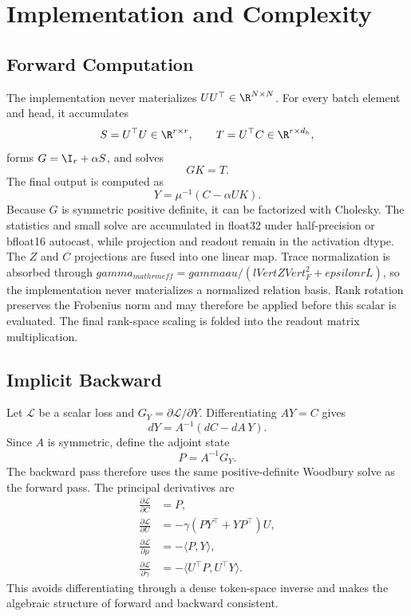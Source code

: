 \section{Implementation and Complexity}
\label{sec:implementation}

\subsection{Forward Computation}

The implementation never materializes $UU^\top\in\R^{N\times N}$. For every batch element and head, it accumulates
\begin{equation}
  S=U^\top U\in\R^{r\times r},
  \qquad
  T=U^\top C\in\R^{r\times d_h},
\end{equation}
forms $G=\I_r+\alpha S$, and solves
\begin{equation}
  GK=T.
\end{equation}
The final output is computed as
\begin{equation}
  Y=\mu^{-1}(C-\alpha UK).
\end{equation}
Because $G$ is symmetric positive definite, it can be factorized with Cholesky. The statistics and small solve are accumulated in float32 under half-precision or bfloat16 autocast, while projection and readout remain in the activation dtype. The $Z$ and $C$ projections are fused into one linear map. Trace normalization is absorbed through $gamma_{mathrm{eff}}=gamma	au/(lVert Z
Vert_F^2+epsilon rL)$, so the implementation never materializes a normalized relation basis. Rank rotation preserves the Frobenius norm and may therefore be applied before this scalar is evaluated. The final rank-space scaling is folded into the readout matrix multiplication.

\subsection{Implicit Backward}

Let $\mathcal L$ be a scalar loss and $G_Y=\partial\mathcal L/\partial Y$. Differentiating $AY=C$ gives
\begin{equation}
  dY=A^{-1}(dC-dA\,Y).
\end{equation}
Since $A$ is symmetric, define the adjoint state
\begin{equation}
  P=A^{-1}G_Y.
  \label{eq:adjoint}
\end{equation}
The backward pass therefore uses the same positive-definite Woodbury solve as the forward pass. The principal derivatives are
\begin{align}
  \frac{\partial\mathcal L}{\partial C}&=P,\\
  \frac{\partial\mathcal L}{\partial U}
  &=-\gamma(PY^\top+YP^\top)U,\\
  \frac{\partial\mathcal L}{\partial\mu}
  &=-\langle P,Y\rangle,\\
  \frac{\partial\mathcal L}{\partial\gamma}
  &=-\langle U^\top P,U^\top Y\rangle.
\end{align}
This avoids differentiating through a dense token-space inverse and makes the algebraic structure of forward and backward consistent.

